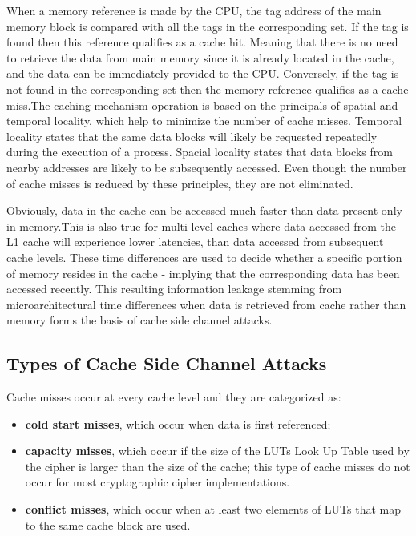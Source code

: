\documentclass[twocolumn]{IEEEtran}
\begin{document}
When a memory reference is made by the CPU, the tag address of the main memory block is compared with all the tags in the corresponding set. If the tag is found then this reference qualifies as a cache hit. Meaning that there is no need to retrieve the data from main memory since it is already located in the cache, and the data can be immediately provided to the CPU. Conversely, if the tag is not found in the corresponding set then the memory reference qualifies as a cache miss.The caching mechanism operation is based on the principals of spatial and temporal locality, which help to minimize the number of
cache misses. Temporal locality states that the same data blocks will likely be requested repeatedly during the execution of a process. Spacial locality states that data blocks from nearby addresses are likely to be subsequently accessed. Even though the number of cache
misses is reduced by these principles, they are not eliminated.

Obviously, data in the cache can be accessed much faster than data present only in memory.This is also true for multi-level caches where data accessed from the L1 cache will experience lower latencies, than data accessed from subsequent cache levels. These time differences are used to decide whether a specific portion of memory resides in the cache - implying that the corresponding data has been accessed recently. This resulting information leakage stemming from microarchitectural time differences when data is retrieved from cache rather than memory forms the basis of cache side channel attacks.

\subsection { Types of Cache Side Channel Attacks }

Cache misses occur at every cache level and they are categorized as:

\begin {itemize}
\item \textbf{cold start misses}, which occur when data is first referenced;
\item \textbf{capacity misses}, which occur if the size of the LUTs Look Up Table used by the cipher is larger than the size of the cache; this type of cache misses do not occur for most cryptographic cipher implementations.
\item \textbf{conflict misses}, which occur when at least two elements of LUTs that map to the same cache block are used.
\end {itemize}
\end{document}
